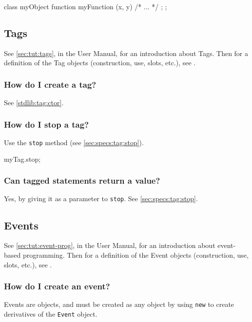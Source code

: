\begin{urbiunchecked}
class myObject
{
  function myFunction (x, y) { /* ... */ };
};
\end{urbiunchecked}


\subsection{Tags}

See \autoref{sec:tut:tags}, in the \us User Manual, for an
introduction about Tags.  Then for a definition of the Tag objects
(construction, use, slots, etc.), see .

\subsubsection{How do I create a tag?}
See \autoref{stdlib:tag:ctor}.

\subsubsection{How do I stop a tag?}
Use the \lstinline|stop| method (see \autoref{sec:specs:tag:stop}).
\begin{urbiunchecked}
myTag.stop;
\end{urbiunchecked}

\subsubsection{Can tagged statements return a value?}
Yes, by giving it as a parameter to \lstinline{stop}.  See
\autoref{sec:specs:tag:stop}.


\subsection{Events}

See \autoref{sec:tut:event-prog}, in the \us User Manual, for an
introduction about event-based programming.  Then for a definition of
the Event objects (construction, use, slots, etc.), see
.

\subsubsection{How do I create an event?}
Events are objects, and must be created as any object by using
\lstinline{new} to create derivatives of the \lstinline{Event} object.

